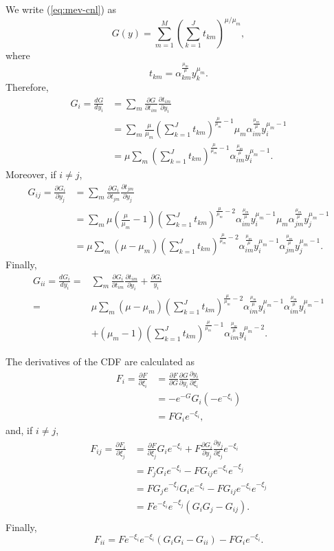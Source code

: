 \documentclass[12pt,a4paper]{article}
\newcommand{\req}[1]{(\ref{#1})}
\begin{document}
We write \req{eq:mev-cnl} as
\[
G(y)= \sum_{m=1}^M \left( \sum_{k=1}^{J} t_{km} \right)^{\mu/\mu_m},
\]
where
\[
t_{km} = \alpha_{km}^{\frac{\mu_m}{\mu}} y_k^{\mu_m}.
\]
Therefore,
\begin{align*}
G_i = \frac{d G}{d y_i} &= \sum_m  \frac{\partial G}{\partial t_{im}} \frac{\partial
  t_{im}}{\partial y_i} \\
&= \sum_m  \frac{\mu}{\mu_m} \left(\sum_{k=1}^{J} t_{km} \right)^{\frac{\mu}{\mu_m}-1}\mu_m \alpha_{im}^{\frac{\mu_m}{\mu}} y_i^{\mu_m-1} \\
&= \mu \sum_m  \left(\sum_{k=1}^{J} t_{km} \right)^{\frac{\mu}{\mu_m}-1} \alpha_{im}^{\frac{\mu_m}{\mu}} y_i^{\mu_m-1}. 
\end{align*}
Moreover, if $i \neq j$,
\begin{align*}
G_{ij} = \frac{\partial G_i}{\partial y_j} &=  \sum_m  \frac{\partial G_i}{\partial t_{jm}} \frac{\partial
  t_{jm}}{\partial y_j} \\
 &=  \sum_m  \mu (\frac{\mu}{\mu_m}-1)
\left(\sum_{k=1}^{J} t_{km} \right)^{\frac{\mu}{\mu_m}-2}
\alpha_{im}^{\frac{\mu_m}{\mu}} y_i^{\mu_m-1} \mu_m
\alpha_{jm}^{\frac{\mu_m}{\mu}} y_j^{\mu_m-1} \\
 &= \mu  \sum_m  (\mu-\mu_m)
\left(\sum_{k=1}^{J} t_{km} \right)^{\frac{\mu}{\mu_m}-2}
\alpha_{im}^{\frac{\mu_m}{\mu}} y_i^{\mu_m-1} \alpha_{jm}^{\frac{\mu_m}{\mu}} y_j^{\mu_m-1}.
\end{align*}
Finally,
\begin{align*}
G_{ii} = \frac{d G_i}{d y_i} =&  \sum_m  \frac{\partial G_i}{\partial t_{im}} \frac{\partial
  t_{im}}{\partial y_i} + \frac{\partial G_i}{y_i} \\
=&\mu  \sum_m  (\mu-\mu_m)
\left(\sum_{k=1}^{J} t_{km} \right)^{\frac{\mu}{\mu_m}-2}
\alpha_{im}^{\frac{\mu_m}{\mu}} y_i^{\mu_m-1}
\alpha_{im}^{\frac{\mu_m}{\mu}} y_i^{\mu_m-1} \\
&+ (\mu_m-1)  \left(\sum_{k=1}^{J} t_{km} \right)^{\frac{\mu}{\mu_m}-1} \alpha_{im}^{\frac{\mu_m}{\mu}} y_i^{\mu_m-2}. 
\end{align*}

The derivatives of the CDF are calculated as
\begin{align*}
F_i = \frac{\partial F}{\partial \xi_i} &= \frac{\partial F}{\partial G}
\frac{\partial G}{\partial y_i} \frac{\partial y_i}{\partial \xi_i} \\
&= -e^{-G} G_i (-e^{-\xi_i}) \\
&= F G_i e^{-\xi_i},
\end{align*}
and, if $i\neq j$,
\begin{align*}
F_{ij} = \frac{\partial F_i}{\partial \xi_j} &= \frac{\partial F}{\partial \xi_j} G_i
e^{-\xi_i} + F \frac{\partial G_i}{\partial y_j} \frac{\partial
  y_j}{\partial \xi_j}e^{-\xi_i} \\
 &= F_j G_i e^{-\xi_i} - F G_{ij} e^{-\xi_i} e^{-\xi_j} \\
&= F G_j e^{-\xi_j} G_i e^{-\xi_i} - F G_{ij} e^{-\xi_i} e^{-\xi_j} \\
&= F e^{-\xi_i} e^{-\xi_j} (G_i G_j - G_{ij} ). \\
\end{align*}
Finally,
\[
F_{ii} = F e^{-\xi_i} e^{-\xi_i} (G_i G_i - G_{ii} ) - F G_i e^{-\xi_i}.
\]



\end{document}
